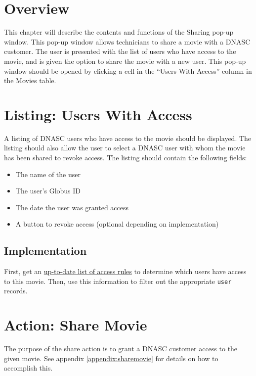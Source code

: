 
\section{Overview}

This chapter will describe the contents and functions of the Sharing pop-up window. This 
pop-up window allows technicians to share a movie with a DNASC customer. The user is presented
with the list of users who have access to the movie, and is given the option to share the movie
with a new user. This pop-up window should be opened by clicking a cell in the 
``Users With Access'' column in the Movies table.

\section{Listing: Users With Access}

A listing of DNASC users who have access to the movie should be displayed. The listing should
also allow the user to select a DNASC user with whom the movie has been shared to revoke access.
The listing should contain the following fields:

\begin{itemize}\itemsep1pt
    \item The name of the user
    \item The user's Globus ID
    \item The date the user was granted access
    \item A button to revoke access (optional depending on implementation)
\end{itemize}

\subsection{Implementation}

First, get an \hyperref[section:updatingcollectionaccessrules]{up-to-date list of access rules} 
to determine which users have access to this movie. Then, use this information to filter out the 
appropriate \texttt{user} records.

\section{Action: Share Movie}

The purpose of the share action is to grant a DNASC customer access to the given movie.
See appendix \ref{appendix:sharemovie} for details on how to accomplish this.